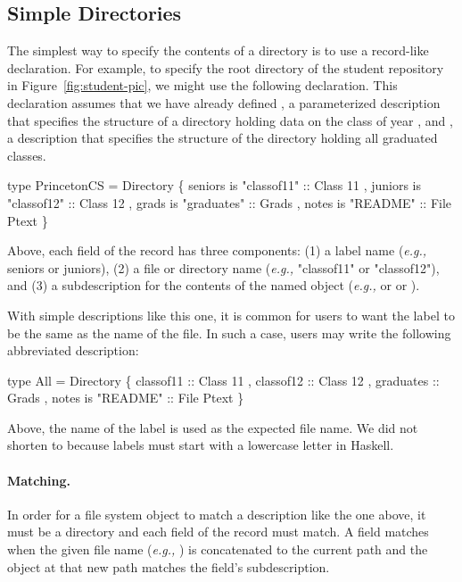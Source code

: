 \subsection{Simple Directories}
\label{sec:simple-directories}

The simplest way to specify the contents of a directory is to use
a record-like declaration.  For example, to specify the root directory
of the student repository in Figure~\ref{fig:student-pic}, we might use
the following declaration.  This declaration assumes that we have already
defined , a parameterized description that specifies
the structure of a directory holding data on the class of year ,
and , a description that specifies the structure of the directory holding
all graduated classes.   
\begin{code}
type PrincetonCS = Directory
  \{ seniors is "classof11" :: Class 11
  , juniors is "classof12" :: Class 12
  , grads is "graduates" :: Grads
  , notes is "README" :: File Ptext
  \}
\end{code}
Above, each field of the record has three components:  (1) a label
name ({\it e.g.,} seniors or juniors), (2) a file or directory name
({\it e.g.,} "classof11" or "classof12"), and (3) a \forest{} subdescription
for the contents of the named object ({\it e.g.,}  or 
or ).

With simple descriptions like this one, it is common for users to want
the label to be the same as the name of the file.  In such a case, users
may write the following abbreviated description:
\begin{code}
type All = Directory
  \{ classof11 :: Class 11
  , classof12 :: Class 12
  , graduates :: Grads
  , notes is "README" :: File Ptext
  \}
\end{code}
Above, the name of the label is used as the expected file name.  We did not
shorten  to  because labels must start
with a lowercase letter in Haskell.

\paragraph*{Matching.}
In order for a file system object to match a description like the one above, it must be a
directory and each field of the record must match.  A field matches when the given
file name ({\em e.g.,} ) is concatenated to the current path and the 
object at that new path matches the field's subdescription.

